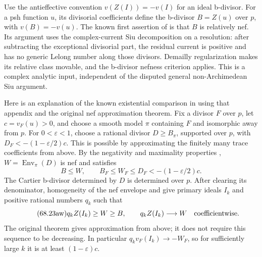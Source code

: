 Use the antieffective convention $v(Z(I))=-v(I)$ for an ideal
b-divisor. For a psh function $u$, its divisorial coefficients define
the b-divisor $B=Z(u)$ over $p$, with $v(B)=-v(u)$.
The known first assertion of
\cite[Proposition~A.9]{GuedjTrusiani25LocalPublished} is that $B$ is
relatively nef. Its argument uses the complex-current Siu decomposition
on a resolution: after subtracting the exceptional divisorial part,
the residual current is positive and has no generic Lelong number
along those divisors. Demailly regularization makes its relative
class movable, and the b-divisor nefness criterion applies. This is
a complex analytic input, independent of the disputed general
non-Archimedean Siu argument.

Here is an explanation of the known existential comparison in
\cite[Lemma~5.9]{GuedjTrusiani25LocalPublished} using that appendix
and the original nef approximation theorem. Fix a divisor $F$ over
$p$, let $c=v_F(u)>0$, and choose a smooth model $\pi$ containing
$F$ and isomorphic away from $p$. For $0<\varepsilon<1$, choose
a rational divisor $D\geq B_\pi$, supported over $p$, with
$D_F<-(1-\varepsilon/2)c$. This is possible by approximating the
finitely many trace coefficients from above. By the negativity and
maximality properties
\cite[Proposition~2.12 and Corollary~2.13]{BdFF12PublishedAuthor},
$W=\operatorname{Env}_\pi(D)$ is nef and satisfies
\[
\tag{68.23av}\label{eq:ytd-local-klt-envelope-order}
 B\leq W,
 \qquad B_F\leq W_F\leq D_F<-(1-\varepsilon/2)c.
\]
The Cartier b-divisor determined by $D$ is determined over $p$.
After clearing its denominator, homogeneity of the nef envelope
and \cite[Theorem~4.11]{BdFF12PublishedAuthor} give primary ideals
$I_k$ and positive rational numbers $q_k$ such that
\[
\tag{68.23aw}\label{eq:ytd-local-klt-primary-approximation}
 q_kZ(I_k)\geq W\geq B,
 \qquad q_kZ(I_k)\longrightarrow W
       \quad\hbox{coefficientwise}.
\]
The original theorem gives approximation from above; it does not
require this sequence to be decreasing. In particular
$q_kv_F(I_k)\to-W_F$, so for sufficiently large $k$ it is at least
$(1-\varepsilon)c$.

